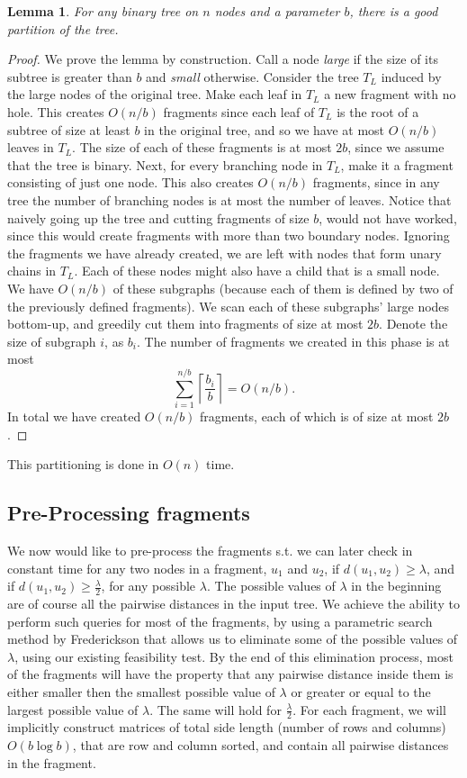 \documentclass[11pt,a4paper]{article}
\newtheorem{lemma}{Lemma}
\theoremstyle{definition}
\theoremstyle{remark}
\begin{document}
\begin{lemma}\label{basic partitioning lemma}
For any binary tree on $n$ nodes and a parameter $b$, there is a good partition of the tree.
\end{lemma}
\begin{proof}
We prove the lemma by construction. Call a node \textit{large} if the size of its subtree is greater than $b$ and \textit{small} otherwise. Consider the tree $T_L$ induced by the large nodes of the original tree. Make each leaf in $T_L$ a new fragment with no hole. This creates $O(n/b)$ fragments since each leaf of $T_L$ is the root of a subtree of size at least $b$ in the original tree, and so we have at most $O(n/b)$ leaves in $T_L$. The size of each of these fragments is at most $2b$, since we assume that the tree is binary. Next, for every branching node in $T_L$, make it a fragment consisting of just one node. This also creates $O(n/b)$ fragments, since in any tree the number of branching nodes is at most the number of leaves. Notice that naively going up the tree and cutting fragments of size $b$, would not have worked, since this would create fragments with more than two boundary nodes. Ignoring the fragments we have already created, we are left with nodes that form unary chains in $T_L$. Each of these nodes might also have a child that is a small node. We have $O(n/b)$ of these subgraphs (because each of them is defined by two of the previously defined fragments). We scan each of these subgraphs' large nodes bottom-up, and greedily cut them into fragments of size at most $2b$. Denote the size of subgraph $i$, as $b_i$. The number of fragments we created in this phase is at most $$\sum_{i=1}^{n/b} \left\lceil \frac{b_i}{b} \right\rceil = O(n/b).$$
In total we have created $O(n/b)$ fragments, each of which is of size at most $2b$.
\end{proof}
This partitioning is done in $O(n)$ time.

\subsection{Pre-Processing fragments} \label{Pre-Processing Fragments}
We now would like to pre-process the fragments s.t. we can later check in constant time for any two nodes in a fragment, $u_1$ and $u_2$, if $d(u_1,u_2)\geq\lambda$, and if $d(u_1,u_2) \geq \frac{\lambda}{2}$, for any possible $\lambda$. The possible values of $\lambda$ in the beginning are of course all the pairwise distances in the input tree. We achieve the ability to perform such queries for most of the fragments, by using a parametric search method by Frederickson that allows us to eliminate some of the possible values of $\lambda$, using our existing feasibility test. By the end of this elimination process, most of the fragments will have the property that any pairwise distance inside them is either smaller then the smallest possible value of $\lambda$ or
 greater or equal to the largest possible value of $\lambda$. The same will hold for $\frac{\lambda}{2}$.
For each fragment, we will implicitly construct matrices of total side length (number of rows and columns) $O(b \log b)$, that are row and column sorted, and contain all pairwise distances in the fragment.
\end{document}
